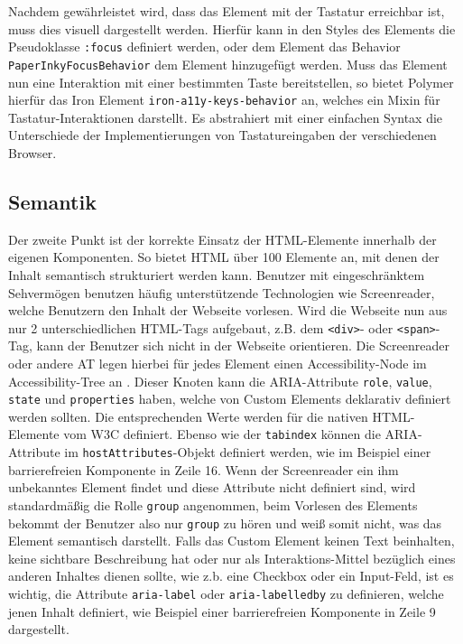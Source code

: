 Nachdem gewährleistet wird, dass das Element mit der Tastatur erreichbar ist, muss dies visuell dargestellt werden. Hierfür kann in den Styles des Elements die Pseudoklasse \texttt{:focus} definiert werden, oder dem Element das Behavior \texttt{PaperInkyFocusBehavior} dem Element hinzugefügt werden. Muss das Element nun eine Interaktion mit einer bestimmten Taste bereitstellen, so bietet Polymer hierfür das Iron Element \texttt{iron-a11y-keys-behavior} an, welches ein Mixin für Tastatur-Interaktionen darstellt. Es abstrahiert mit einer einfachen Syntax die Unterschiede der Implementierungen von Tastatureingaben der verschiedenen Browser.


\subsection{Semantik}\label{semantik}

Der zweite Punkt ist der korrekte Einsatz der \ac{HTML}-Elemente innerhalb der eigenen Komponenten. So bietet \ac{HTML} über 100 Elemente an, mit denen der Inhalt semantisch strukturiert werden kann. Benutzer mit eingeschränktem Sehvermögen benutzen häufig unterstützende Technologien wie Screenreader, welche Benutzern den Inhalt der Webseite vorlesen. Wird die Webseite nun aus nur 2 unterschiedlichen \ac{HTML}-Tags aufgebaut, z.B. dem \texttt{\textless{}div\textgreater{}}- oder \texttt{\textless{}span\textgreater{}}-Tag, kann der Benutzer sich nicht in der Webseite orientieren. Die Screenreader oder andere \ac{AT} legen hierbei für jedes Element einen Accessibility-Node im Accessibility-Tree an \cite{citeulike:13915306}. Dieser Knoten kann die \ac{ARIA}-Attribute \texttt{role}, \texttt{value}, \texttt{state} und \texttt{properties} haben, welche von Custom Elements deklarativ definiert werden sollten. Die entsprechenden Werte werden für die nativen \ac{HTML}-Elemente vom \ac{W3C} definiert. Ebenso wie der \texttt{tabindex} können die \ac{ARIA}-Attribute im \texttt{hostAttributes}-Objekt definiert werden, wie im Beispiel einer barrierefreien Komponente in Zeile 16. Wenn der Screenreader ein ihm unbekanntes Element findet und diese Attribute nicht definiert sind, wird standardmäßig die Rolle \texttt{group} angenommen, beim Vorlesen des Elements bekommt der Benutzer also nur \texttt{group} zu hören und weiß somit nicht, was das Element semantisch darstellt. Falls das Custom Element keinen Text beinhalten, keine sichtbare Beschreibung hat oder nur als Interaktions-Mittel bezüglich eines anderen Inhaltes dienen sollte, wie z.b. eine Checkbox oder ein Input-Feld, ist es wichtig, die Attribute \texttt{aria-label} oder \texttt{aria-labelledby} zu definieren, welche jenen Inhalt definiert, wie Beispiel einer barrierefreien Komponente in Zeile 9 dargestellt.


